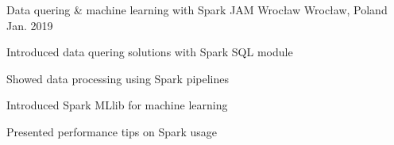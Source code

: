 
\begin{cventries}

  \cventry
    {Data quering & machine learning with Spark}
    {JAM Wrocław}
    {Wrocław, Poland}
    {Jan. 2019}
    {
      \begin{cvitems}
        \item {Introduced data quering solutions with Spark SQL module}
        \item {Showed data processing using Spark pipelines}
        \item {Introduced Spark MLlib for machine learning}
        \item {Presented performance tips on Spark usage}
      \end{cvitems}
    }

\end{cventries}
